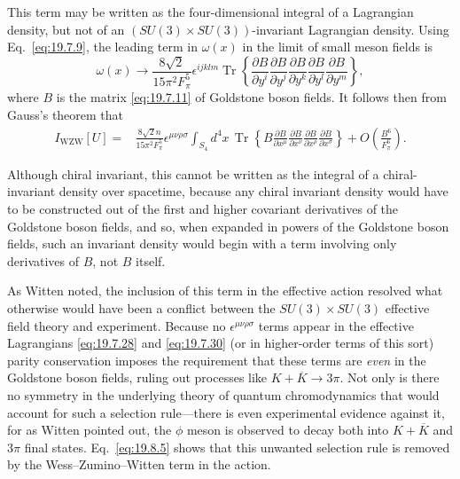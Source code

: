 This term may be written as the four-dimensional integral of a Lagrangian density, but not of an $(SU(3)\times SU(3))$-invariant Lagrangian density. Using Eq.~\eqref{eq:19.7.9}, the leading term in $\omega(x)$ in the limit of small meson fields is
\begin{equation}
\omega(x)\longrightarrow
\frac{8\sqrt{2}}{15\pi^2F_\pi^5}\epsilon^{ijklm}
\operatorname{Tr}\left\{
\frac{\partial B}{\partial y^i}
\frac{\partial B}{\partial y^j}
\frac{\partial B}{\partial y^k}
\frac{\partial B}{\partial y^l}
\frac{\partial B}{\partial y^m}
\right\},
\tag{19.8.4}\label{eq:19.8.4}
\end{equation}
where $B$ is the matrix \eqref{eq:19.7.11} of Goldstone boson fields. It follows then from Gauss's theorem that
\begin{align}
I_{\mathrm{WZW}}[U]
={}&\frac{8\sqrt{2}n}{15\pi^2F_\pi^5}\epsilon^{\mu\nu\rho\sigma}
\int_{S_4}d^4x\,
\operatorname{Tr}\left\{
B\frac{\partial B}{\partial x^\mu}
\frac{\partial B}{\partial x^\nu}
\frac{\partial B}{\partial x^\rho}
\frac{\partial B}{\partial x^\sigma}
\right\}
+O\left(\frac{B^6}{F_\pi^6}\right).
\tag{19.8.5}\label{eq:19.8.5}
\end{align}

Although chiral invariant, this cannot be written as the integral of a chiral-invariant density over spacetime, because any chiral invariant density would have to be constructed out of the first and higher covariant derivatives of the Goldstone boson fields, and so, when expanded in powers of the Goldstone boson fields, such an invariant density would begin with a term involving only derivatives of $B$, not $B$ itself.

As Witten noted, the inclusion of this term in the effective action resolved what otherwise would have been a conflict between the $SU(3)\times SU(3)$ effective field theory and experiment. Because no $\epsilon^{\mu\nu\rho\sigma}$ terms appear in the effective Lagrangians \eqref{eq:19.7.28} and \eqref{eq:19.7.30} (or in higher-order terms of this sort) parity conservation imposes the requirement that these terms are \emph{even} in the Goldstone boson fields, ruling out processes like $K+\overline K\to3\pi$. Not only is there no symmetry in the underlying theory of quantum chromodynamics that would account for such a selection rule---there is even experimental evidence against it, for as Witten pointed out, the $\phi$ meson is observed to decay both into $K+\overline K$ and $3\pi$ final states. Eq.~\eqref{eq:19.8.5} shows that this unwanted selection rule is removed by the Wess--Zumino--Witten term in the action.


